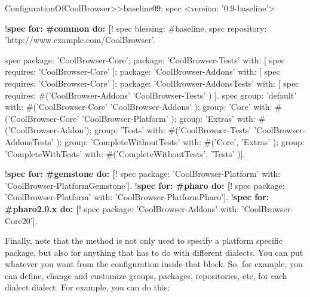 \documentclass[a4paper,10pt,twoside]{book}
\begin{document}
\begin{code}{}
ConfigurationOfCoolBrowser>>baseline09: spec 
      <version: '0.9-baseline'>
      
      !\textbf{spec for: \#common do: [}!
            spec blessing: #baseline.
            spec repository: 'http://www.example.com/CoolBrowser'.
            
            spec 
                  package: 'CoolBrowser-Core';
                  package: 'CoolBrowser-Tests' with: [ spec requires: 'CoolBrowser-Core' ];
                  package: 'CoolBrowser-Addons' with: [ spec requires: 'CoolBrowser-Core' ];
                  package: 'CoolBrowser-AddonsTests' with: [ 
                        spec requires: #('CoolBrowser-Addons' 'CoolBrowser-Tests' ) ].
            spec 
                  group: 'default' with: #('CoolBrowser-Core' 'CoolBrowser-Addons' );
                  group: 'Core' with: #('CoolBrowser-Core' 'CoolBrowser-Platform' );
                  group: 'Extras' with: #('CoolBrowser-Addon');
                  group: 'Tests' with: #('CoolBrowser-Tests' 'CoolBrowser-AddonsTests' );
                  group: 'CompleteWithoutTests' with: #('Core', 'Extras' );
                  group: 'CompleteWithTests' with: #('CompleteWithoutTests', 'Tests' )].
                  
      !\textbf{spec for: \#gemstone do: [}!
            spec package: 'CoolBrowser-Platform' with: 'CoolBrowser-PlatformGemstone'].
      !\textbf{spec for: \#pharo do: [}!
            spec package: 'CoolBrowser-Platform' with: 'CoolBrowser-PlatformPharo'].
      !\textbf{spec for: \#pharo2.0.x do: [}!
            spec package: 'CoolBrowser-Addons' with: 'CoolBrowser-Core20'].
\end{code}    
    

Finally, note that the method  is not only used to specify a platform specific package, but also for anything that has to do with different dialects. You can put whatever you want from the configuration inside that block. So, for example, you can define, change and customize groups, packages, repositories, etc, for each dialect dialect. For example, you can do this:
\end{document}
